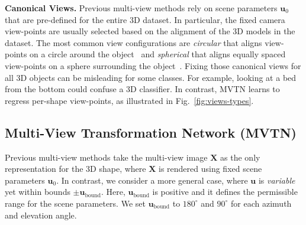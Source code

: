 \documentclass[10pt,twocolumn,letterpaper]{article}
\newcommand{\figLabel}{Fig.~}
\newcommand{\mysection}[1]{\noindent\textbf{#1.}}
\begin{document}
\mysection{Canonical Views}
Previous multi-view methods rely on scene parameters $\mathbf{u}_0$ that are pre-defined for the entire 3D dataset. In particular, the fixed camera view-points are usually selected based on the alignment of the 3D models in the dataset. The most common view configurations are \textit{circular} that aligns view-points on a circle around the object~\cite{mvcnn,mvnhbn} and \textit{spherical} that aligns equally spaced view-points on a sphere surrounding the object~\cite{mvviewgcn,mvrotationnet}. 
Fixing those canonical views for all 3D objects can be misleading for some classes. For example, looking at a bed from the bottom could confuse a 3D classifier.
In contrast, MVTN learns to regress per-shape view-points, as illustrated in \figLabel{\ref{fig:views-types}}.

\subsection{Multi-View Transformation Network (MVTN)}
\vspace{-4pt}
Previous multi-view methods take the multi-view image $\mathbf{X}$ as the only representation for the 3D shape, where $\mathbf{X}$ is rendered using fixed scene parameters $\mathbf{u}_0$. In contrast, we consider a more general case, where $\mathbf{u}$ is \textit{variable} yet within bounds $\pm \mathbf{u}_{\text{bound}}$.
Here, $\mathbf{u}_{\text{bound}}$ is positive and it defines the permissible range for the scene parameters.
We set $\mathbf{u}_{\text{bound}} $ to  $180^\circ$ and $90^\circ$ for each azimuth and elevation angle. 
\end{document}
